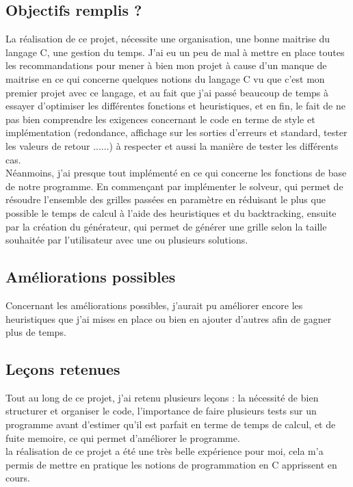 \documentclass[12pt]{article}
\begin{document}
  \subsection{Objectifs remplis ?}
  La réalisation de ce projet, nécessite une organisation, une bonne maitrise du langage C, une gestion du temps. J'ai eu un peu de mal à mettre en place toutes les recommandations pour mener à bien mon projet à cause d'un manque de maitrise en ce qui concerne quelques notions du langage C vu que c'est mon premier projet avec ce langage, et au fait que j'ai passé beaucoup de temps à essayer d'optimiser les différentes fonctions et heuristiques, et en fin, le fait de ne pas bien comprendre les exigences concernant le code en terme de style et implémentation (redondance, affichage sur les sorties d'erreurs et standard, tester les valeurs de retour ......) à respecter et aussi la manière de tester les différents cas.\\ Néanmoins, j'ai presque tout implémenté en ce qui concerne les fonctions de base de notre programme. En commençant par implémenter le solveur, qui permet de résoudre l'ensemble des grilles passées en paramètre en réduisant le plus que possible le temps de calcul à l'aide des heuristiques et du backtracking, ensuite par la création du générateur, qui permet de générer une grille selon la taille souhaitée par l'utilisateur avec une ou plusieurs solutions.
  \subsection{Améliorations possibles}
  Concernant les améliorations possibles, j'aurait pu améliorer encore les heuristiques que j'ai mises en place ou bien en ajouter d'autres afin de gagner plus de temps.
  \subsection{Leçons retenues}
  Tout au long de ce projet, j'ai retenu plusieurs leçons : la nécessité de bien structurer et organiser le code, l'importance de faire plusieurs tests sur un programme avant d'estimer qu'il est parfait en terme de temps de calcul, et de fuite memoire, ce qui permet d'améliorer le programme.\\ la réalisation de ce projet a été une très belle expérience pour moi, cela m'a permis de mettre en pratique les notions de programmation en C apprissent en cours.
  
    
\end{document}
